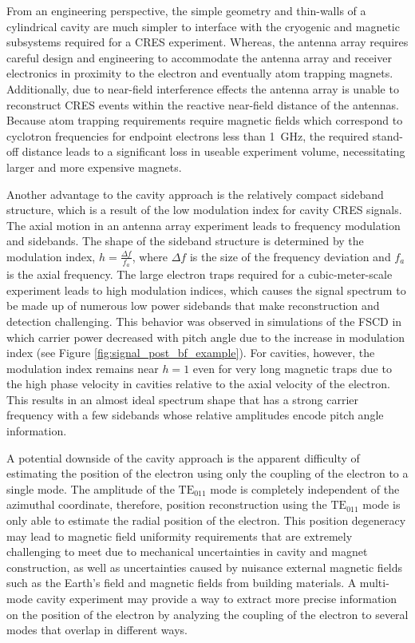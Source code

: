 From an engineering perspective, the simple geometry and thin-walls of a cylindrical cavity are much simpler to interface with the cryogenic and magnetic subsystems required for a CRES experiment. Whereas, the antenna array requires careful design and engineering to accommodate the antenna array and receiver electronics in proximity to the electron and eventually atom trapping magnets. Additionally, due to near-field interference effects the antenna array is unable to reconstruct CRES events within the reactive near-field distance of the antennas. Because atom trapping requirements require magnetic fields which correspond to cyclotron frequencies for endpoint electrons less than 1~GHz, the required stand-off distance leads to a significant loss in useable experiment volume, necessitating larger and more expensive magnets.

Another advantage to the cavity approach is the relatively compact sideband structure, which is a result of the low modulation index for cavity CRES signals. The axial motion in an antenna array experiment leads to frequency modulation and sidebands. The shape of the sideband structure is determined by the modulation index, $h=\frac{\Delta f}{f_a}$, where $\Delta f$ is the size of the frequency deviation and $f_a$ is the axial frequency. The large electron traps required for a cubic-meter-scale experiment leads to high modulation indices, which causes the signal spectrum to be made up of numerous low power sidebands that make reconstruction and detection challenging. This behavior was observed in simulations of the FSCD in which carrier power decreased with pitch angle due to the increase in modulation index (see Figure \ref{fig:signal_post_bf_example}). For cavities, however, the modulation index remains near $h=1$ even for very long magnetic traps due to the high phase velocity in cavities relative to the axial velocity of the electron. This results in an almost ideal spectrum shape that has a strong carrier frequency with a few sidebands whose relative amplitudes encode pitch angle information. 

A potential downside of the cavity approach is the apparent difficulty of estimating the position of the electron using only the coupling of the electron to a single mode. The amplitude of the $\mathrm{TE}_{011}$ mode is completely independent of the azimuthal coordinate, therefore, position reconstruction using the $\mathrm{TE}_{011}$ mode is only able to estimate the radial position of the electron. This position degeneracy may lead to magnetic field uniformity requirements that are extremely challenging to meet due to mechanical uncertainties in cavity and magnet construction, as well as uncertainties caused by nuisance external magnetic fields such as the Earth's field and magnetic fields from building materials. A multi-mode cavity experiment may provide a way to extract more precise information on the position of the electron by analyzing the coupling of the electron to several modes that overlap in different ways.

